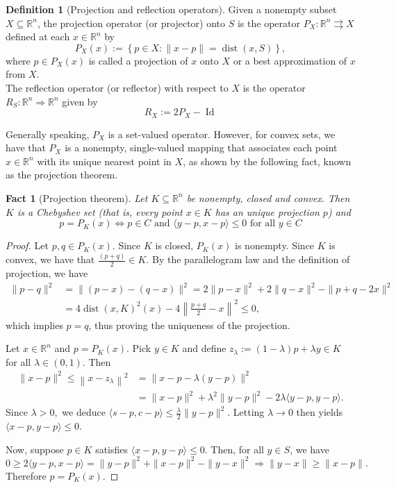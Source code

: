 \documentclass[smallextended,numbook,nospthms]{svjour3}
\theoremstyle{plain}
\newtheorem{fact}[theorem]{Fact}
\theoremstyle{definition}
\newtheorem{definition}[theorem]{Definition}
\def\RR{\mathds R}
\DeclareMathOperator{\dist}{dist}
\begin{document}
\begin{definition}[Projection and reflection operators]{\label{def:proj}}
	Given a nonempty subset $X \subseteq \RR^n$, the projection operator (or projector) onto $S$ is the operator $P_{X}: \RR^n \rightrightarrows X$ defined at each $x \in \RR^n$ by
	\[
	P_{X}(x):=\left\{p \in X:\|x-p\|=\dist(x,S)\right\},
	\]
	where $p \in P_{X}(x)$ is called a projection of $x$ onto $X$ or a best approximation of $x$ from $X$.\\
	The reflection operator (or reflector) with respect to $X$ is the operator $R_{S}: \RR^n \Rightarrow \RR^n$ given by
	\[
	R_{X}:=2P_{X}-\operatorname{Id}
	\]
\end{definition}

Generally speaking, $P_{X}$ is a set-valued operator.
However, for convex sets, we have that $P_{X}$ is a nonempty, single-valued mapping that associates each point $x \in \RR^n$ with its unique nearest point in $X$, as shown by the following fact, known as the projection theorem.

\begin{fact}[Projection theorem]\label{fact:proj thm}
	Let $K \subseteq \RR^{n}$ be nonempty, closed and convex. Then $K$ is a Chebyshev set (that is, every point $x \in K$ has an unique projection $p$) and
	\begin{equation}
		p=P_{K}(x) \iff p \in C \text { and }\langle y-p, x-p\rangle \leq 0 \text { for all } y \in C
	\end{equation}
\end{fact}
\begin{proof}
	Let $p, q \in P_{K}(x)$. Since $K$ is closed, $P_{K}(x)$ is nonempty. Since $K$ is convex, we have that $\frac{(p+q)}{2} \in K$. By the parallelogram law and the definition of projection, we have
	\[
	\begin{aligned}
		\|p-q\|^{2} &=\|(p-x)-(q-x)\|^{2} = 2\|p-x\|^{2}+2\|q-x\|^{2}-\|p+q-2 x\|^{2} \\
		&=4 \dist(x,K)^{2}(x)-4\left\|\frac{p+q}{2}-x\right\|^{2} \leq 0,
	\end{aligned}
	\]
	which implies $p=q$, thus proving the uniqueness of the projection. 
	
	Let $x \in \RR^n$ and $p=P_{K}(x)$. Pick $y \in K$ and define $z_{\lambda}:=(1-\lambda) p+\lambda y \in K$ for all $\lambda \in (0,1)$. Then
	\begin{align}
		\|x-p\|^{2} \leq\left\|x-z_{\lambda}\right\|^{2} &=\|x-p-\lambda(y-p)\|^{2} \\
		&=\|x-p\|^{2}+\lambda^{2}\|y-p\|^{2}-2 \lambda\langle y-p, y-p\rangle.
	\end{align}
	Since $\lambda>0,$ we deduce $\langle s-p, c-p\rangle \leq \frac{\lambda}{2}\|y-p\|^{2}$. Letting $\lambda \rightarrow 0$ then yields $\langle x-p, y-p\rangle \leq 0$.
	
	Now, suppose $p \in K$ satisfies
	$\langle x-p, y-p\rangle \leq 0$. Then, for all $y \in S$, we have
	\[
	0 \geq 2\langle y-p, x-p\rangle=\|y-p\|^{2}+\|x-p\|^{2}-\|y-x\|^{2} \Longrightarrow\|y-x\| \geq\|x-p\|.
	\]
	Therefore $p=P_{K}(x)$.
\end{proof}
\end{document}
